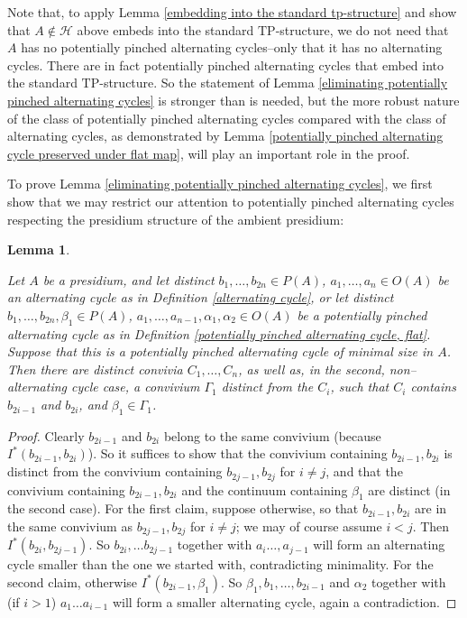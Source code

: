 \documentclass{amsart}
\newtheorem{lemma}[theorem]{Lemma}
\theoremstyle{definition}
\theoremstyle{remark}
\numberwithin{equation}{section}
\begin{document}
Note that, to apply Lemma \ref{embedding into the standard tp-structure} and show that $A \notin \mathcal{H}$ above embeds into the standard $\mathrm{TP}$-structure, we do not need that $A$ has no potentially pinched alternating cycles--only that it has no alternating cycles. There are in fact potentially pinched alternating cycles that embed into the standard $\mathrm{TP}$-structure. So the statement of Lemma \ref{eliminating potentially pinched alternating cycles} is stronger than is needed, but the more robust nature of the class of potentially pinched alternating cycles compared with the class of alternating cycles, as demonstrated by Lemma \ref{potentially pinched alternating cycle preserved under flat map}, will play an important role in the proof.

To prove Lemma \ref{eliminating potentially pinched alternating cycles}, we first show that we may restrict our attention to potentially pinched alternating cycles respecting the presidium structure of the ambient presidium:


\begin{lemma}
    \label{potentially pinched alternating cycle respects presidium structure}

Let $A$ be a presidium, and let distinct $b_{1}, \ldots, b_{2n} \in P(A)$, $a_1, \ldots, a_n \in O(A)$ be an alternating cycle as in Definition \ref{alternating cycle}, or let distinct $b_{1}, \ldots, b_{2n}, \beta_1 \in P(A)$, $a_1, \ldots, a_{n-1}, \alpha_1, \alpha_2 \in O(A)$ be a potentially pinched alternating cycle as in Definition \ref{potentially pinched alternating cycle, flat}. Suppose that this is a potentially pinched alternating cycle of minimal size in $A$. Then there are distinct convivia $C_{1}, \ldots, C_{n} $, as well as, in the second, non--alternating cycle case, a convivium $\Gamma_{1}$ distinct from the $C_{i}$, such that $C_{i}$ contains $b_{2i-1}$ and $b_{2i}$, and $\beta_{1} \in \Gamma_{1}$.

    
\end{lemma}


\begin{proof}
    Clearly $b_{2i-1}$ and $b_{2i}$ belong to the same convivium (because $I^{*}(b_{2i-1}, b_{2i})$). So it suffices to show that the convivium containing $b_{2i-1}, b_{2i}$ is distinct from the convivium containing $b_{2j-1}, b_{2j}$ for $i \neq j$, and that the convivium containing $b_{2i-1}, b_{2i}$ and the continuum containing $\beta_1$ are distinct (in the second case). For the first claim,  suppose otherwise, so that $b_{2i-1}, b_{2i}$ are in the same convivium as $b_{2j-1}, b_{2j}$ for $i \neq j$; we may of course assume $i < j$. Then $I^{*}(b_{2i}, b_{2j-1})$. So $b_{2i} , \ldots b_{2j-1}$ together with $a_{i} \ldots, a_{j-1}$ will form an alternating cycle smaller than the one we started with, contradicting minimality.  For the second claim, otherwise $I^{*}(b_{2i-1}, \beta_{1})$. So $\beta_{1}, b_{1}, \ldots, b_{2i-1}$ and $\alpha_{2}$ together with (if $i > 1$) $a_{1} \ldots a_{i-1}$ will form a smaller alternating cycle, again a contradiction.
\end{proof}
\end{document}

